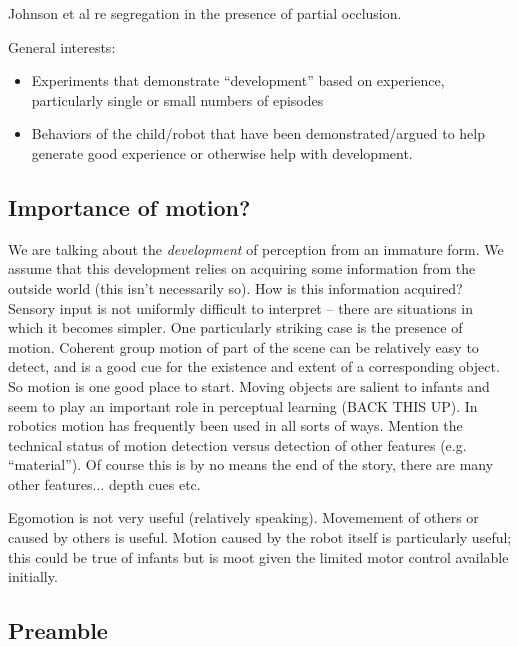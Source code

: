 
Johnson et al re segregation in the presence of partial occlusion.



\noindent General interests:

\begin{itemize}

\item Experiments that demonstrate ``development'' based on experience,
   particularly single or small numbers of episodes

\item Behaviors of the child/robot that have been demonstrated/argued
   to help generate good experience or otherwise help with development.

\end{itemize}


\subsection{Importance of motion?}

We are talking about the {\em development} of perception from an
immature form.  We assume that this development relies on acquiring
some information from the outside world (this isn't necessarily so).
How is this information acquired?  Sensory input is not 
uniformly difficult to interpret -- there are situations in
which it becomes simpler.  One particularly striking case is
the presence of motion.  Coherent group motion of part of the 
scene can be relatively easy to detect, and is a good cue for
the existence and extent of a corresponding object.  
So motion is one good place to start.
%
Moving objects are salient to infants and seem to play an
important role in perceptual learning (BACK THIS UP).
%
In robotics motion has frequently been used in all sorts of
ways.
%
Mention the technical status of motion detection versus
detection of other features (e.g. ``material'').
%
Of course this is by no means the end of the story, there 
are many other features... depth cues etc.

Egomotion is not very useful (relatively speaking).  Movemement of
others or caused by others is useful.  Motion caused by the robot
itself is particularly useful; this could be true of infants but is
moot given the limited motor control available initially.

\subsection{Preamble}

